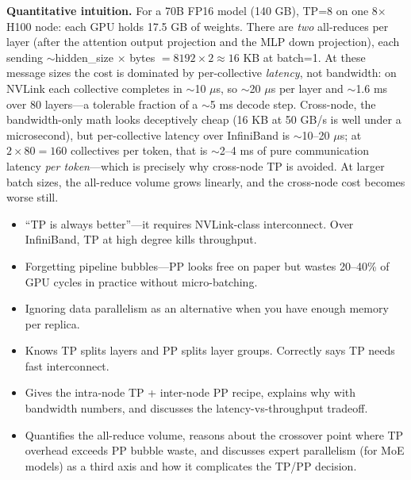 \begin{interviewq}
\textbf{Quantitative intuition.} For a 70B FP16 model (140 GB), TP=8 on one 8$\times$H100 node: each GPU holds 17.5 GB of weights. There are \textit{two} all-reduces per layer (after the attention output projection and the MLP down projection), each sending $\sim$hidden\_size $\times$ bytes $= 8192 \times 2 \approx 16$ KB at batch=1. At these message sizes the cost is dominated by per-collective \textit{latency}, not bandwidth: on NVLink each collective completes in $\sim$10 $\mu$s, so $\sim$20 $\mu$s per layer and $\sim$1.6 ms over 80 layers---a tolerable fraction of a $\sim$5 ms decode step. Cross-node, the bandwidth-only math looks deceptively cheap (16 KB at 50 GB/s is well under a microsecond), but per-collective latency over InfiniBand is $\sim$10--20 $\mu$s; at $2 \times 80 = 160$ collectives per token, that is $\sim$2--4 ms of pure communication latency \textit{per token}---which is precisely why cross-node TP is avoided. At larger batch sizes, the all-reduce volume grows linearly, and the cross-node cost becomes worse still.

\redflags
\begin{itemize}
    \item ``TP is always better''---it requires NVLink-class interconnect. Over InfiniBand, TP at high degree kills throughput.
    \item Forgetting pipeline bubbles---PP looks free on paper but wastes 20--40\% of GPU cycles in practice without micro-batching.
    \item Ignoring data parallelism as an alternative when you have enough memory per replica.
\end{itemize}


\goodgreat
\begin{itemize}
    \item {} Knows TP splits layers and PP splits layer groups. Correctly says TP needs fast interconnect.
    \item {} Gives the intra-node TP + inter-node PP recipe, explains why with bandwidth numbers, and discusses the latency-vs-throughput tradeoff.
    \item {} Quantifies the all-reduce volume, reasons about the crossover point where TP overhead exceeds PP bubble waste, and discusses expert parallelism (for MoE models) as a third axis and how it complicates the TP/PP decision.
\end{itemize}

\end{interviewq}

